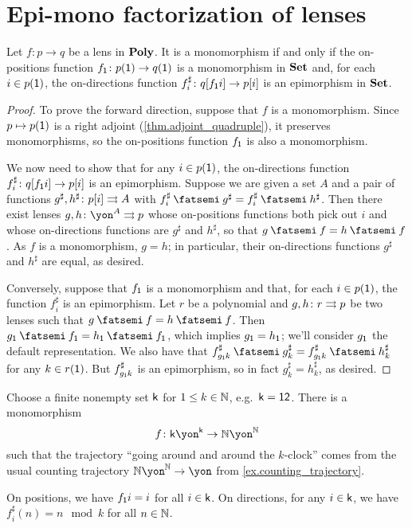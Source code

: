 \documentclass[Book-Poly]{subfiles}
\begin{document}
\section{Epi-mono factorization of lenses}



\begin{proposition}\label{prop.monics_in_poly}
Let $f \colon p \to q$ be a lens in $\mathbf{Poly}$. It is a monomorphism if and only if the on-positions function $f_{\textsf{1}} \colon p(\textsf{1}) \to q(\textsf{1})$ is a monomorphism in $\mathbf{Set}$ and, for each $i \in p(\textsf{1})$, the on-directions function $f^\sharp_i \colon q[f_{\textsf{1}}i]\to p[i]$ is an epimorphism in $\mathbf{Set}$.
\end{proposition}
\begin{proof}
To prove the forward direction, suppose that $f$ is a monomorphism.
Since $p\mapsto p(\textsf{1})$ is a right adjoint (\cref{thm.adjoint_quadruple}), it preserves monomorphisms, so the on-positions function $f_{\textsf{1}}$ is also a monomorphism.

We now need to show that for any $i\in p(\textsf{1})$, the on-directions function $f^\sharp_i \colon q[f_{\textsf{1}}i] \to p[i]$ is an epimorphism.
Suppose we are given a set $A$ and a pair of functions $g^\sharp,h^\sharp\colon p[i]\rightrightarrows A$ with $f^\sharp_i \then g^\sharp = f^\sharp_i \then h^\sharp$.
Then there exist lenses $g,h \colon \yon^A \tto p$ whose on-positions functions both pick out $i$ and whose on-directions functions are $g^\sharp$ and $h^\sharp$, so that $g \then f = h \then f$.
As $f$ is a monomorphism, $g = h$; in particular, their on-directions functions $g^\sharp$ and $h^\sharp$ are equal, as desired.

Conversely, suppose that $f_{\textsf{1}}$ is a monomorphism and that, for each $i\in p(\textsf{1})$, the function $f^\sharp_i$ is an epimorphism.
Let $r$ be a polynomial and $g,h\colon r\rightrightarrows p$ be two lenses such that $g \then f = h \then f$.
Then $g_\1 \then f_\1 = h_\1 \then f_\1$, which implies $g_{\textsf{1}} = h_{\textsf{1}}$; we'll consider $g_{\textsf{1}}$ the default representation.
We also have that $f^\sharp_{g_\1k} \then g^\sharp_k = f^\sharp_{g_\1k} \then h^\sharp_k$ for any $k \in r(\textsf{1})$. But $f^\sharp_{g_{\textsf{1}}k}$ is an epimorphism, so in fact $g^\sharp_k = h^\sharp_k$, as desired.
\end{proof}

\begin{example}\label{ex.clock_in_N}
Choose a finite nonempty set $\mathsf{k}$ for $1\leq k\in\mathbb{N}$, e.g.\ $\mathsf{k}=\textsf{1}\textsf{2}$. There is a monomorphism
\[
f \colon\ord{k}\yon^{\ord{k}}\to\nn\yon^\nn
\]
such that the trajectory ``going around and around the $k$-clock'' comes from the usual counting trajectory $\nn\yon^\nn\to\yon$ from \cref{ex.counting_trajectory}.

On positions, we have $f_{\textsf{1}}i=i$ for all $i \in \mathsf{k}$. On directions, for any $i \in \mathsf{k}$, we have $f^\sharp_i(n) = n \mod k$ for all $n \in \mathbb{N}$.
\end{example}
\end{document}
